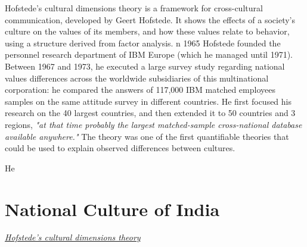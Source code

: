 \documentclass{article}
\begin{document}
Hofstede's cultural dimensions theory \cite{ref:Hofstede's cultural dimensions theory} is a framework for cross-cultural communication, developed by Geert Hofstede. It shows the effects of a society's culture on the values of its members, and how these values relate to behavior, using a structure derived from factor analysis. n 1965 Hofstede founded the personnel research department of IBM Europe (which he managed until 1971). Between 1967 and 1973, he executed a large survey study regarding national values differences across the worldwide subsidiaries of this multinational corporation: he compared the answers of 117,000 IBM matched employees samples on the same attitude survey in different countries. He first focused his research on the 40 largest countries, and then extended it to 50 countries and 3 regions, \textit{"at that time probably the largest matched-sample cross-national database available anywhere."} The theory was one of the first quantifiable theories that could be used to explain observed differences between cultures.

He

\section{National Culture of India}

\begin{thebibliography}{99}

    {\em \href{https://en.wikipedia.org/wiki/Hofstede%27s_cultural_dimensions_theory#Dimensions_of_national_culturess/}{Hofstede's cultural dimensions theory}}

\end{thebibliography}
\end{document}
